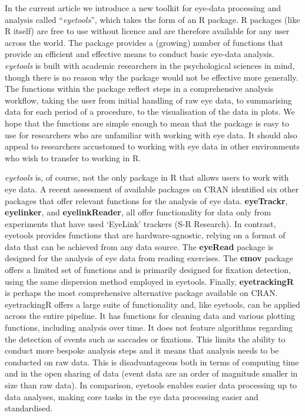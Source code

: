 \documentclass[
  man,
  floatsintext,
  longtable,
  nolmodern,
  notxfonts,
  notimes,
  colorlinks=true,linkcolor=blue,citecolor=blue,urlcolor=blue]{apa7}
\begin{document}
In the current article we introduce a new toolkit for eye-data
processing and analysis called ``\emph{eyetools}'', which takes the form
of an R package. R packages (like R itself) are free to use without
licence and are therefore available for any user across the world. The
package provides a (growing) number of functions that provide an
efficient and effective means to conduct basic eye-data analysis.
\emph{eyetools} is built with academic researchers in the psychological
sciences in mind, though there is no reason why the package would not be
effective more generally. The functions within the package reflect steps
in a comprehensive analysis workflow, taking the user from initial
handling of raw eye data, to summarising data for each period of a
procedure, to the visualisation of the data in plots. We hope that the
functions are simple enough to mean that the package is easy to use for
researchers who are unfamiliar with working with eye data. It should
also appeal to researchers accustomed to working with eye data in other
environments who wish to transfer to working in R.

\emph{eyetools} is, of course, not the only package in R that allows
users to work with eye data. A recent assessment of available packages
on CRAN identified six other packages that offer relevant functions for
the analysis of eye data. \textbf{eyeTrackr}, \textbf{eyelinker}, and
\textbf{eyelinkReader}, all offer functionality for data only from
experiments that have used `EyeLink' trackers (S-R Research). In
contrast, eyetools provides functions that are hardware-agnostic,
relying on a format of data that can be achieved from any data source.
The \textbf{eyeRead} package is designed for the analysis of eye data
from reading exercises. The \textbf{emov} package offers a limited set
of functions and is primarily designed for fixation detection, using the
same dispersion method employed in eyetools. Finally,
\textbf{eyetrackingR} is perhaps the most comprehensive alternative
package available on CRAN. eyetrackingR offers a large suite of
functionality and, like eyetools, can be applied across the entire
pipeline. It has functions for cleaning data and various plotting
functions, including analysis over time. It does not feature algorithms
regarding the detection of events such as saccades or fixations. This
limits the ability to conduct more bespoke analysis steps and it means
that analysis needs to be conducted on raw data. This is disadvantageous
both in terms of computing time and in the open sharing of data (event
data are an order of magnitude smaller in size than raw data). In
comparison, eyetools enables easier data processing up to data analyses,
making core tasks in the eye data processing easier and standardised.
\end{document}
